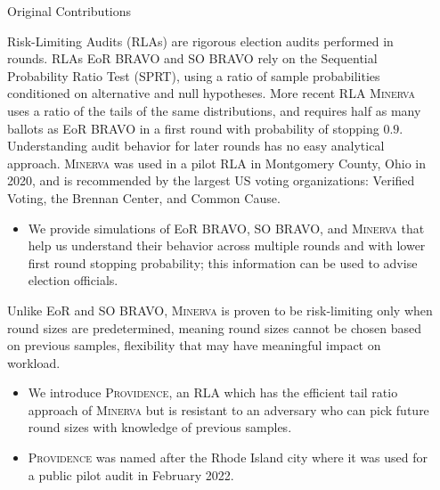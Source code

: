 \documentclass[final]{beamer}
\newcommand{\Minerva}{\textsc{Minerva}\xspace}
\newcommand{\Prov}{\textsc{Providence}\xspace}
\newcommand{\BRAVO}{\textsc{BRAVO}\xspace}
\newlength{\sepwidth}
\newlength{\colwidth}
\newcommand{\separatorcolumn}{\begin{column}{\sepwidth}\end{column}}
\begin{document}
\begin{frame}[t]
\begin{columns}[t]
\separatorcolumn

\begin{column}{\colwidth}

\begin{block}{Original Contributions}

Risk-Limiting Audits (RLAs) are rigorous election audits performed in rounds. 
RLAs EoR \BRAVO and SO \BRAVO \cite{bravo} rely on the Sequential Probability Ratio Test (SPRT), using
a ratio of sample probabilities conditioned on alternative and null hypotheses.
More recent RLA \Minerva \cite{usenix_minerva} uses a ratio of the tails of the same distributions, and requires half as many
ballots as EoR \BRAVO in a first round with probability of stopping $0.9$.
Understanding audit behavior for later rounds has no easy analytical approach.
\Minerva was used in a pilot RLA in Montgomery County, Ohio in 2020,
and is recommended by the largest US voting organizations: Verified Voting, the Brennan Center, and Common Cause.

\begin{itemize}
\item
We provide simulations \cite{simulations} of EoR \BRAVO, SO \BRAVO, and \Minerva that help us understand their behavior across multiple rounds and with lower
first round stopping probability; this information can be used to advise election officials.
\end{itemize}

Unlike EoR and SO \BRAVO, \Minerva is proven to be risk-limiting only when round sizes are predetermined, 
meaning round sizes cannot be chosen based on previous samples, flexibility that may have meaningful impact on workload.

\begin{itemize}
\item We introduce \Prov, an RLA which has the efficient tail ratio approach of \Minerva but is resistant to an adversary who can pick
future round sizes with knowledge of previous samples. 
\item \Prov was named after the Rhode Island city where it was used for a public
pilot audit in February 2022.
\end{itemize}
\end{block}


\end{column}
\end{columns}
\end{frame}
\end{document}
